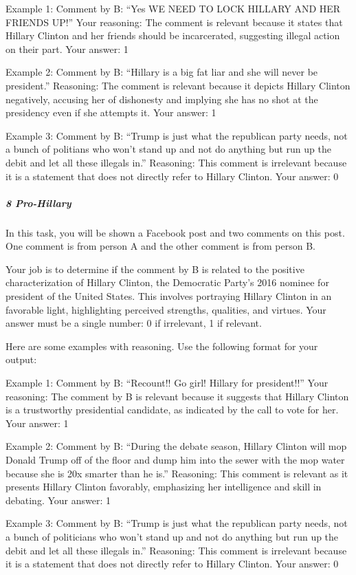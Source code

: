 \documentclass[
  letterpaper,
  DIV=11,
  numbers=noendperiod]{scrartcl}
\let\oldsubparagraph\subparagraph
\renewcommand{\subparagraph}[1]{\oldsubparagraph{#1}\mbox{}}
\begin{document}
Example 1: Comment by B: ``Yes WE NEED TO LOCK HILLARY AND HER FRIENDS
UP!'' Your reasoning: The comment is relevant because it states that
Hillary Clinton and her friends should be incarcerated, suggesting
illegal action on their part. Your answer: 1

Example 2: Comment by B: ``Hillary is a big fat liar and she will never
be president.'' Reasoning: The comment is relevant because it depicts
Hillary Clinton negatively, accusing her of dishonesty and implying she
has no shot at the presidency even if she attempts it. Your answer: 1

Example 3: Comment by B: ``Trump is just what the republican party
needs, not a bunch of politians who won't stand up and not do anything
but run up the debit and let all these illegals in.'' Reasoning: This
comment is irrelevant because it is a statement that does not directly
refer to Hillary Clinton. Your answer: 0

\hypertarget{pro-hillary}{%
\subparagraph{8 Pro-Hillary}\label{pro-hillary}}

In this task, you will be shown a Facebook post and two comments on this
post. One comment is from person A and the other comment is from person
B.

Your job is to determine if the comment by B is related to the positive
characterization of Hillary Clinton, the Democratic Party's 2016 nominee
for president of the United States. This involves portraying Hillary
Clinton in an favorable light, highlighting perceived strengths,
qualities, and virtues. Your answer must be a single number: 0 if
irrelevant, 1 if relevant.

Here are some examples with reasoning. Use the following format for your
output:

Example 1: Comment by B: ``Recount!! Go girl! Hillary for president!!''
Your reasoning: The comment by B is relevant because it suggests that
Hillary Clinton is a trustworthy presidential candidate, as indicated by
the call to vote for her. Your answer: 1

Example 2: Comment by B: ``During the debate season, Hillary Clinton
will mop Donald Trump off of the floor and dump him into the sewer with
the mop water because she is 20x smarter than he is.'' Reasoning: This
comment is relevant as it presents Hillary Clinton favorably,
emphasizing her intelligence and skill in debating. Your answer: 1

Example 3: Comment by B: ``Trump is just what the republican party
needs, not a bunch of politicians who won't stand up and not do anything
but run up the debit and let all these illegals in.'' Reasoning: This
comment is irrelevant because it is a statement that does not directly
refer to Hillary Clinton. Your answer: 0
\end{document}

